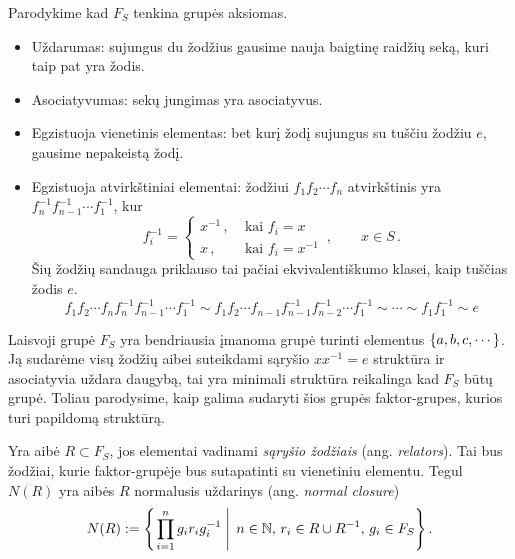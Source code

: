 \begin{example}
	Parodykime kad $F_S$ tenkina grupės aksiomas.
	\begin{itemize}
		\item Uždarumas:
			sujungus du žodžius gausime nauja baigtinę raidžių seką, kuri taip pat yra žodis.
		\item Asociatyvumas:
			sekų jungimas yra asociatyvus.
		\item Egzistuoja vienetinis elementas:
			bet kurį žodį sujungus su tuščiu žodžiu $e$, gausime nepakeistą žodį.
		\item Egzistuoja atvirkštiniai elementai:
			žodžiui $f_1 f_2 \cdots f_n$ atvirkštinis yra $f_{n}^{-1} f_{n-1}^{-1} \cdots f_1^{-1}$,
			kur 
			\begin{equation}
				f_i^{-1}= 
				\begin{cases}
					x^{-1}\,,\;	&\text{kai } f_i=x
					\\
					x\,,		&\text{kai } f_i=x^{-1}
				\end{cases}
				\,,\qquad
				x \in S
				\,.
			\end{equation}
			Šių žodžių sandauga priklauso tai pačiai ekvivalentiškumo klasei,
			kaip tuščias žodis $e$.
			\begin{equation}
				f_1 f_2 \cdots f_n f_{n}^{-1} f_{n-1}^{-1} \cdots f_1^{-1}
				\sim
				f_1 f_2 \cdots f_{n-1} f_{n-1}^{-1} f_{n-2}^{-1} \cdots f_1^{-1}
				\sim \cdots \sim 
				f_1 f_1^{-1} \sim e
			\end{equation}
	\end{itemize}
\end{example}

Laisvoji grupė $F_S$ yra bendriausia įmanoma grupė turinti elementus $\qty{a, b, c, \cdots}$.
Ją sudarėme visų žodžių aibei suteikdami sąryšio $xx^{-1}=e$ struktūra ir asociatyvia uždara daugybą,
tai yra minimali struktūra reikalinga kad $F_S$ būtų grupė.
Toliau parodysime, kaip galima sudaryti šios grupės faktor-grupes,
kurios turi papildomą struktūrą.

Yra aibė $R \subset F_S$,
jos elementai vadinami \emph{sąryšio žodžiais} (ang. \emph{relators}).
Tai bus žodžiai, kurie faktor-grupėje bus sutapatinti su vienetiniu elementu.
Tegul $N(R)$ yra aibės $R$ normalusis uždarinys (ang. \emph{normal closure})
\begin{equation}
	N(R) := \qty{
		\left.
		\prod_{i=1}^n g_i r_i g_i^{-1}
		\;\right|\;
		n \in  \mathbb{N}  ,\,
		r_i \in R \cup R^{-1} ,\,
		g_i \in F_S
	}
	\,.
\end{equation}

